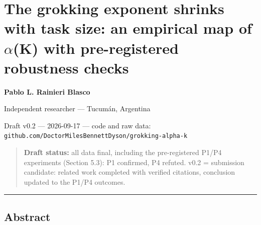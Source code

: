\documentclass[
  11pt,
]{article}
\author{}
\date{}
\begin{document}
\section{The grokking exponent shrinks with task size: an empirical map
of $\alpha$(K) with pre-registered robustness
checks}\label{the-grokking-exponent-shrinks-with-task-size-an-empirical-map-of-ux3b1k-with-pre-registered-robustness-checks}

\textbf{Pablo L. Rainieri Blasco}

Independent researcher --- Tucumán, Argentina

Draft v0.2 --- 2026-09-17 --- code and raw data:
\texttt{github.com/DoctorMilesBennettDyson/grokking-alpha-k}

\begin{quote}
\textbf{Draft status:} all data final, including the pre-registered
P1/P4 experiments (Section 5.3): P1 confirmed, P4 refuted. v0.2 =
submission candidate: related work completed with verified citations,
conclusion updated to the P1/P4 outcomes.
\end{quote}

\begin{center}\rule{0.5\linewidth}{0.5pt}\end{center}

\subsection{Abstract}\label{abstract}
\end{document}
